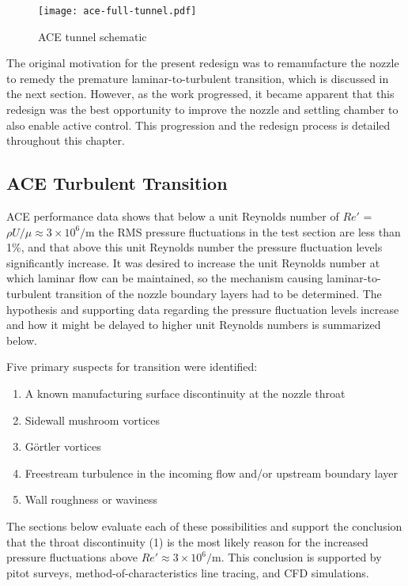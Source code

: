 \begin{figure}[ht!]
    \centering
    \texttt{[image: ace-full-tunnel.pdf]}
    \caption{ACE tunnel schematic}
    \label{fig:ace-full-tunnel}
\end{figure}

The original motivation for the present redesign was to remanufacture the nozzle to remedy the premature laminar-to-turbulent transition, which is discussed in the next section. However, as the work progressed, it became apparent that this redesign was the best opportunity to improve the nozzle and settling chamber to also enable active control. This progression and the redesign process is detailed throughout this chapter.

\subsection{ACE Turbulent Transition}

ACE performance data \cite{aceturb,mai-dis,neel-dis,leidy-dis} shows that below a unit Reynolds number of $Re'$ = $\rho U/\mu \approx 3 \times 10^6/\mathrm{m}$ the RMS pressure fluctuations in the test section are less than 1\%, and that above this unit Reynolds number the pressure fluctuation levels significantly increase. It was desired to increase the unit Reynolds number at which laminar flow can be maintained, so the mechanism causing laminar-to-turbulent transition of the nozzle boundary layers had to be determined. The hypothesis and supporting data regarding the pressure fluctuation levels increase and how it might be delayed to higher unit Reynolds numbers is summarized below.

Five primary suspects for transition were identified:

\begin{enumerate}
    \item A known manufacturing surface discontinuity at the nozzle throat
    \item Sidewall mushroom vortices
    \item Görtler vortices
    \item Freestream turbulence in the incoming flow and/or upstream boundary layer
    \item Wall roughness or waviness
\end{enumerate}

The sections below evaluate each of these possibilities and support the conclusion that the throat discontinuity (1) is the most likely reason for the increased pressure fluctuations above $Re' \approx 3 \times 10^6/\mathrm{m}$. This conclusion is supported by pitot surveys, method-of-characteristics line tracing, and CFD simulations. 

